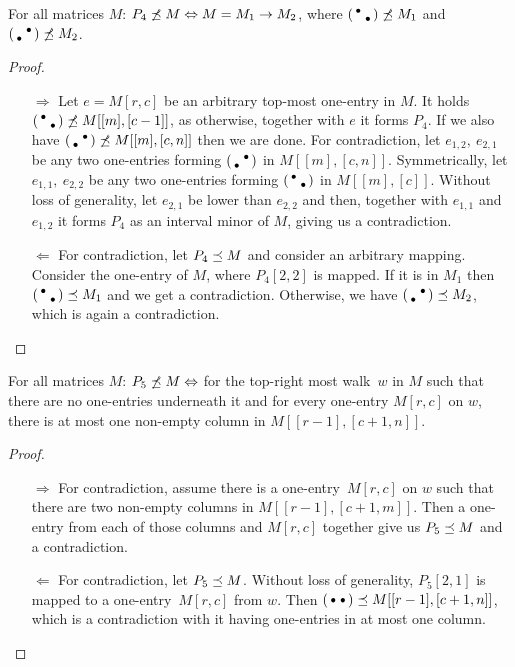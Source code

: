 \begin{prop}
For all matrices $M$: $P_4\not\preceq M\Leftrightarrow M=M_1\rightarrow M_2$, where $\left(\begin{smallmatrix}\bullet& \\ &\bullet\end{smallmatrix}\right)\not\preceq M_1$ and $\left(\begin{smallmatrix} &\bullet\\\bullet& \end{smallmatrix}\right)\not\preceq M_2$.
\end{prop}
\begin{proof}
\begin{itemize}
	\item[$\Rightarrow$] Let $e=M[r,c]$ be an arbitrary top-most one-entry in $M$. It holds $\left(\begin{smallmatrix}\bullet& \\ &\bullet\end{smallmatrix}\right)\not\preceq M[[m],[c-1]]$, as otherwise, together with $e$ it forms $P_4$. If we also have $\left(\begin{smallmatrix} &\bullet\\\bullet& \end{smallmatrix}\right)\not\preceq M[[m],[c,n]]$ then we are done. For contradiction, let $e_{1,2},\ e_{2,1}$ be any two one-entries forming $\left(\begin{smallmatrix} &\bullet\\\bullet& \end{smallmatrix}\right)$ in $M[[m],[c,n]]$. Symmetrically, let $e_{1,1},\ e_{2,2}$ be any two one-entries forming $\left(\begin{smallmatrix}\bullet& \\ &\bullet\end{smallmatrix}\right)$ in $M[[m],[c]]$. Without loss of generality, let $e_{2,1}$ be lower than $e_{2,2}$ and then, together with $e_{1,1}$ and $e_{1,2}$ it forms $P_4$ as an interval minor of $M$, giving us a contradiction. 
	\item[$\Leftarrow$] For contradiction, let $P_4\preceq M$ and consider an arbitrary mapping. Consider the one-entry of $M$, where $P_4[2,2]$ is mapped. If it is in $M_1$ then $\left(\begin{smallmatrix}\bullet& \\ &\bullet\end{smallmatrix}\right)\preceq M_1$ and we get a contradiction. Otherwise, we have $\left(\begin{smallmatrix} &\bullet\\\bullet& \end{smallmatrix}\right)\preceq M_2$, which is again a contradiction.
\end{itemize}
\end{proof}

\begin{prop}
For all matrices $M$: $P_5\not\preceq M\Leftrightarrow$ for the top-right most walk~$w$ in $M$ such that there are no one-entries underneath it and for every one-entry $M[r,c]$ on $w$, there is at most one non-empty column in $M[[r-1],[c+1,n]]$.
\end{prop}
\begin{proof}
\begin{itemize}
	\item[$\Rightarrow$] For contradiction, assume there is a one-entry~$M[r,c]$ on $w$ such that there are two non-empty columns in $M[[r-1],[c+1,m]]$. Then a one-entry from each of those columns and $M[r,c]$ together give us $P_5\preceq M$ and a contradiction. 
	\item[$\Leftarrow$] For contradiction, let $P_5\preceq M$. Without loss of generality, $P_5[2,1]$ is mapped to a one-entry~$M[r,c]$ from $w$. Then $\left(\begin{smallmatrix}\bullet&\bullet\end{smallmatrix}\right)\preceq M[[r-1],[c+1,n]]$, which is a contradiction with it having one-entries in at most one column.
\end{itemize}
\end{proof}

